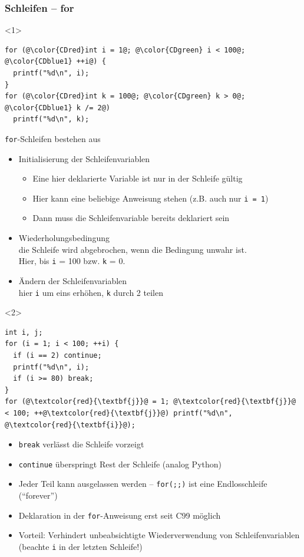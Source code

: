 \documentclass{slides}
\begin{document}
\begin{frame}[fragile]
  \frametitle{Schleifen -- for}

  \begin{onlyenv}<1>
\begin{lstlisting}
for (@\color{CDred}int i = 1@; @\color{CDgreen} i < 100@; @\color{CDblue1} ++i@) {
  printf("%d\n", i);
}
for (@\color{CDred}int k = 100@; @\color{CDgreen} k > 0@; @\color{CDblue1} k /= 2@)
  printf("%d\n", k);
\end{lstlisting}

    \lstinline!for!-Schleifen bestehen aus
    \begin{itemize}
    \item \textcolor{CDred}{Initialisierung der Schleifenvariablen}\\
      \begin{itemize}
      \item Eine hier deklarierte Variable ist nur in der Schleife gültig
      \item Hier kann eine beliebige Anweisung stehen (z.B. auch nur \lstinline!i = 1!)
      \item Dann muss die Schleifenvariable bereits deklariert sein
      \end{itemize}
    \item \textcolor{CDgreen}{Wiederholungsbedingung}\\
      die Schleife wird abgebrochen, wenn die Bedingung unwahr ist.\\
      Hier, bis \lstinline!i! = 100 bzw. \lstinline!k! = 0.
    \item \textcolor{CDblue1}{Ändern der Schleifenvariablen}\\
      hier \lstinline!i! um eins erhöhen, \lstinline!k! durch 2 teilen
    \end{itemize}
  \end{onlyenv}

  \begin{onlyenv}<2>
\begin{lstlisting}
int i, j;
for (i = 1; i < 100; ++i) {
  if (i == 2) continue;
  printf("%d\n", i);
  if (i >= 80) break;
}
for (@\textcolor{red}{\textbf{j}}@ = 1; @\textcolor{red}{\textbf{j}}@ < 100; ++@\textcolor{red}{\textbf{j}}@) printf("%d\n", @\textcolor{red}{\textbf{i}}@);
\end{lstlisting}
    
    \begin{itemize}
    \item \lstinline!break! verlässt die Schleife vorzeigt
    \item \lstinline!continue! überspringt Rest der Schleife (analog Python)
    \item Jeder Teil kann ausgelassen werden -- \lstinline!for(;;)! ist eine Endlosschleife
      ("`forever"')
    \item Deklaration in der \lstinline!for!-Anweisung erst seit C99 möglich
    \item Vorteil: Verhindert unbeabsichtigte Wiederverwendung von Schleifenvariablen
      (beachte \lstinline!i! in der letzten Schleife!)
    \end{itemize}
  \end{onlyenv}
\end{frame}
\end{document}
